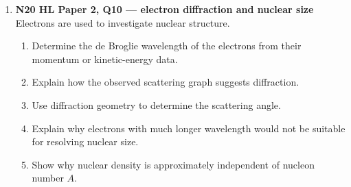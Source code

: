 \documentclass[11pt]{article}
\begin{document}
\begin{enumerate}[leftmargin=*, itemsep=1.2em]
\item \textbf{N20 HL Paper 2, Q10 --- electron diffraction and nuclear size}\\
Electrons are used to investigate nuclear structure.
\begin{enumerate}[label=(\alph*)]
\item Determine the de Broglie wavelength of the electrons from their momentum or kinetic-energy data.
\item Explain how the observed scattering graph suggests diffraction.
\item Use diffraction geometry to determine the scattering angle.
\item Explain why electrons with much longer wavelength would not be suitable for resolving nuclear size.
\item Show why nuclear density is approximately independent of nucleon number $A$.
\end{enumerate}

\end{enumerate}
\end{document}
